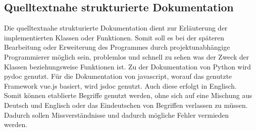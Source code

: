 \subsection{Quelltextnahe strukturierte Dokumentation}
Die quelltextnahe strukturierte Dokumentation dient zur Erläuterung der implementierten Klassen oder Funktionen. Somit soll es bei der späteren Bearbeitung oder Erweiterung des Programmes durch projektunabhängige Programmierer möglich sein, problemlos und schnell zu sehen was der Zweck der Klassen beziehungsweise Funktionen ist. Zu der Dokumentation von Python wird pydoc genutzt. Für die Dokumentation von javascript, worauf das genutzte Framework vue.js basiert, wird jsdoc genutzt. Auch diese erfolgt in Englisch. Somit können etablierte Begriffe genutzt werden, ohne sich auf eine Mischung aus Deutsch und Englisch oder das Eindeutschen von Begriffen verlassen zu müssen. Dadurch sollen Missverständnisse und dadurch mögliche Fehler vermieden werden.